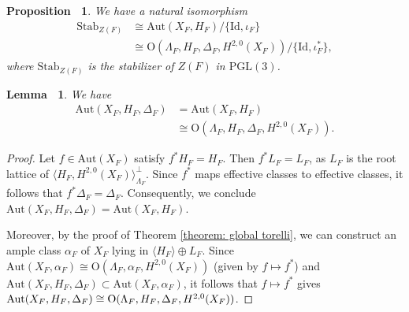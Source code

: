 \documentclass[12pt,reqno,a4paper]{amsart}
\newtheorem{lem}[thm]{Lemma~}
\newtheorem{prop}[thm]{Proposition~}
\theoremstyle{remark}
\theoremstyle{definition}
\newcommand{\p}{p}
\newcommand{\ZZ}{\mathbb{Z}}
\newcommand{\PP}{\mathbb{P}}
\newcommand\Aut{\mathrm{Aut}}
\newcommand\Id{\mathrm{Id}}
\newcommand\Or{\mathrm{O}}
\newcommand\Stab{\mathrm{Stab}}
\newcommand{\PGL}{\mathrm{PGL}}
\begin{document}
\begin{prop}
\label{prop: describe Stab_Z(F)}
    We have a natural isomorphism
    \begin{align*}
        \Stab_{Z(F)} &\cong \Aut(X_F,H_F)/\{\Id,\iota_F\} \\
        &\cong \Or(\Lambda_F,H_F,\Delta_F,H^{2,0}(X_F))/\{\Id,\iota_F^*\},
    \end{align*}
    where $\Stab_{Z(F)}$ is the stabilizer of $Z(F)$ in $\PGL(3)$. 
\end{prop}

\begin{lem}
\label{lem: describe Aut(X_F,H_F,Delta_F)}
    We have
    \begin{align*}
        \Aut(X_F,H_F,\Delta_F) &= \Aut(X_F,H_F) \\
        &\cong \Or(\Lambda_F,H_F,\Delta_F,H^{2,0}(X_F)).
    \end{align*}
\end{lem}
\begin{proof}
    Let $f\in \Aut(X_F)$ satisfy $f^*H_F=H_F$. Then $f^*L_F=L_F$, as $L_F$ is the root lattice of $\langle H_F,H^{2,0}(X_F)\rangle^\perp_{\Lambda_F}$.
    Since $f^*$ maps effective classes to effective classes, it follows that $f^*\Delta_F=\Delta_F$.
    Consequently, we conclude $\Aut(X_F,H_F,\Delta_F) = \Aut(X_F,H_F)$.

    Moreover, by the proof of Theorem \ref{theorem: global torelli}, we can construct an ample class $\alpha_F$ of $X_F$ lying in $\langle H_F\rangle\oplus L_F$.
    Since $\Aut(X_F,\alpha_F)\cong\Or(\Lambda_F,\alpha_F,H^{2,0}(X_F))$ (given by $f\mapsto f^*$) and $\Aut(X_F,H_F,\Delta_F) \subset \Aut(X_F,\alpha_F)$, it follows that $f\mapsto f^*$ gives $\Aut(X_F,H_F,\Delta_F) \cong \\ \Or(\Lambda_F,H_F,\Delta_F,H^{2,0}(X_F))$.
\end{proof}
\end{document}
